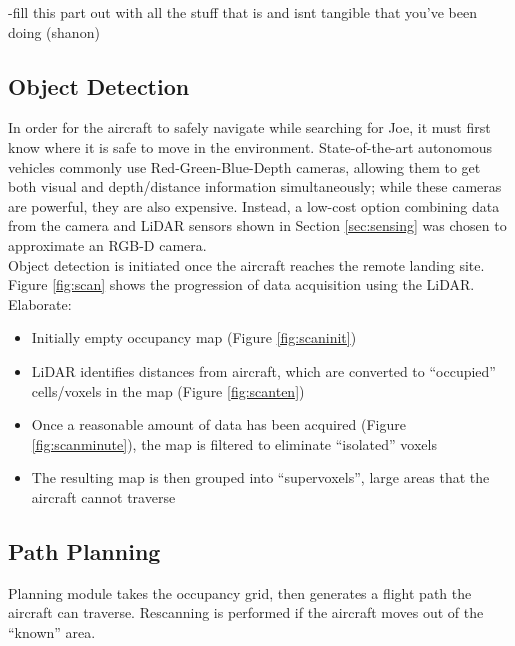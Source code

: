 \color{red}
 -fill this part out with all the stuff that is and isnt tangible that you’ve been doing (shanon)
\color{black}

\subsection{Object Detection}
In order for the aircraft to safely navigate while searching for Joe, it must first know where it is safe to move in the environment. State-of-the-art autonomous vehicles commonly use Red-Green-Blue-Depth cameras, allowing them to get both visual and depth/distance information simultaneously; while these cameras are powerful, they are also expensive. Instead, a low-cost option combining data from the camera and LiDAR sensors shown in Section \ref{sec:sensing} was chosen to approximate an RGB-D camera.\\

Object detection is initiated once the aircraft reaches the remote landing site. Figure \ref{fig:scan} shows the progression of data acquisition using the LiDAR.\\

Elaborate:
\begin{itemize}
	\item Initially empty occupancy map (Figure \ref{fig:scaninit})
	\item LiDAR identifies distances from aircraft, which are converted to ``occupied'' cells/voxels in the map (Figure \ref{fig:scanten})
	\item Once a reasonable amount of data has been acquired (Figure \ref{fig:scanminute}), the map is filtered to eliminate ``isolated'' voxels
	\item The resulting map is then grouped into ``supervoxels'', large areas that the aircraft cannot traverse
\end{itemize}

\subsection{Path Planning}
\color{red}
Planning module takes the occupancy grid, then generates a flight path the aircraft can traverse. Rescanning is performed if the aircraft moves out of the ``known'' area.
\color{black} 

